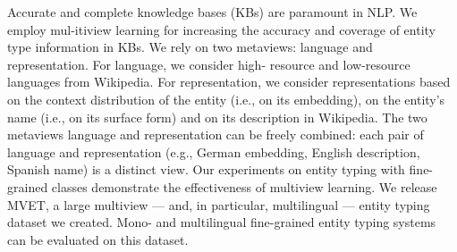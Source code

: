 Accurate and complete knowledge bases (KBs) are paramount in NLP. We employ mul-itiview learning for increasing the accuracy and coverage of entity type information in KBs. We rely on two metaviews: language and representation. For language, we consider high- resource and low-resource languages from Wikipedia. For representation, we consider representations based on the context distribution of the entity (i.e., on its embedding), on the entity's name (i.e., on its surface form) and on its description in Wikipedia. The two metaviews language and representation can be freely combined: each pair of language and representation (e.g., German embedding, English description, Spanish name) is a distinct view. Our experiments on entity typing with fine-grained classes demonstrate the effectiveness of multiview learning. We release MVET, a large multiview --- and, in particular, multilingual --- entity typing dataset we created. Mono- and multilingual fine-grained entity typing systems can be evaluated on this dataset.
